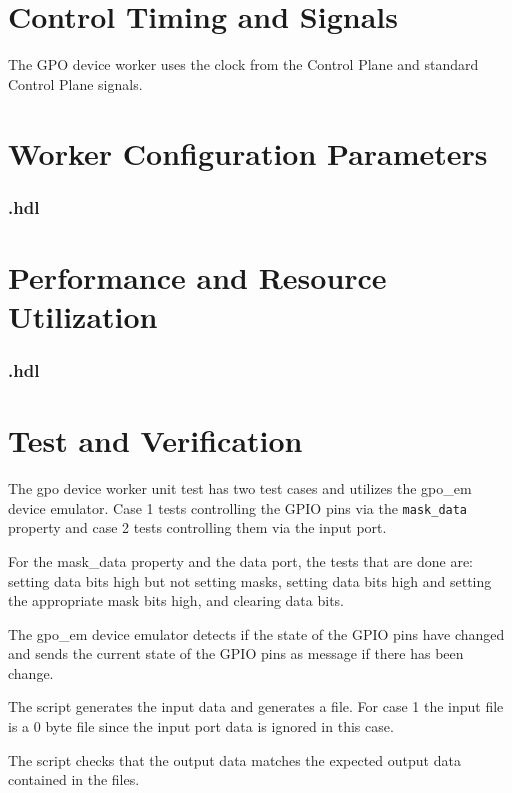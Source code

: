 \section*{Control Timing and Signals}
\begin{flushleft}
The GPO device worker uses the clock from the Control Plane and standard Control Plane signals.
\end{flushleft}

\begin{landscape}
\section*{Worker Configuration Parameters}
\subsubsection*{\comp.hdl}

\section*{Performance and Resource Utilization}
\subsubsection*{\comp.hdl}

\end{landscape}



\section*{Test and Verification}
\normalsize

\begin{flushleft}

The gpo device worker unit test has two test cases and utilizes the gpo\_em device emulator. Case 1 tests controlling the GPIO pins via the \texttt{mask\_data} property and case 2 tests controlling them via the input port. \newline

For the mask\_data property and the data port, the tests that are done are: setting data bits high but not setting masks, setting data bits high and setting the appropriate mask bits high, and clearing data bits.\newline

The gpo\_em device emulator detects if the state of the GPIO pins have changed and sends the current state of the GPIO pins as message if there has been change. \newline

The  script generates the input data and generates a  file. For case 1 the input file is a 0 byte file since the input port data is ignored in this case. \newline

The  script checks that the output data matches the expected output data contained in the  files.

\end{flushleft}

